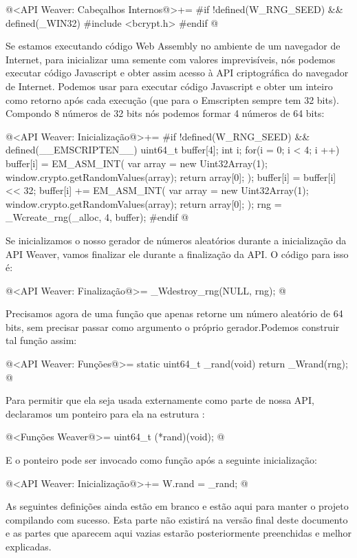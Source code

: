 \iniciocodigo
@<API Weaver: Cabeçalhos Internos@>+=
#if !defined(W_RNG_SEED) && defined(_WIN32)
#include <bcrypt.h>
#endif
@
\fimcodigo

Se estamos executando código Web Assembly no ambiente de um navegador
de Internet, para inicializar uma semente com valores imprevisíveis,
nós podemos executar código Javascript e obter assim acesso à API
criptográfica do navegador de Internet. Podemos
usar  para executar código Javascript e obter
um inteiro como retorno após cada execução (que para o Emscripten
sempre tem 32 bits). Compondo 8 números de 32 bits nós podemos formar
4 números de 64 bits:

\iniciocodigo
@<API Weaver: Inicialização@>+=
#if !defined(W_RNG_SEED) && defined(__EMSCRIPTEN__)
{
  uint64_t buffer[4];
  int i;
  for(i = 0; i < 4; i ++){
    buffer[i] = EM_ASM_INT({
      var array = new Uint32Array(1);
      window.crypto.getRandomValues(array);
      return array[0];
    });
    buffer[i] = buffer[i] << 32;
    buffer[i] += EM_ASM_INT({
      var array = new Uint32Array(1);
      window.crypto.getRandomValues(array);
      return array[0];
    });
  }
  rng = _Wcreate_rng(_alloc, 4, buffer);
}
#endif
@
\fimcodigo

Se inicializamos o nosso gerador de números aleatórios durante a
inicialização da API Weaver, vamos finalizar ele durante a finalização
da API. O código para isso é:

\iniciocodigo
@<API Weaver: Finalização@>=
_Wdestroy_rng(NULL, rng);
@
\fimcodigo

Precisamos agora de uma função que apenas retorne um número aleatório
de 64 bits, sem precisar passar como argumento o próprio
gerador.Podemos construir tal função assim:

\iniciocodigo
@<API Weaver: Funções@>=
static uint64_t _rand(void){
  return _Wrand(rng);
}
@
\fimcodigo

Para permitir que ela seja usada externamente como parte de nossa API,
declaramos um ponteiro para ela na estrutura :

\iniciocodigo
@<Funções Weaver@>=
uint64_t (*rand)(void);
@
\fimcodigo

E o ponteiro pode ser invocado como função após a seguinte
inicialização:

\iniciocodigo
@<API Weaver: Inicialização@>+=
W.rand = _rand;
@
\fimcodigo




As seguintes definições ainda estão em branco e estão aqui para manter
o projeto compilando com sucesso. Esta parte não existirá na versão
final deste documento e as partes que aparecem aqui vazias estarão
posteriormente preenchidas e melhor explicadas.

